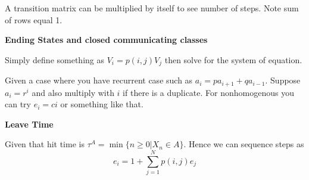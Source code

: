 \documentclass[8pt]{extarticle}
\begin{document}
A transition matrix can be multiplied by itself to see number of steps. Note sum of rows equal 1.

\textbf{Ending States and closed communicating classes}

Simply define something as $V_i = p(i,j)V_j$ then solve for the system of equation.

Given a case where you have recurrent case such as $a_i = pa_{i+1} + qa_{i-1}$. Suppose $a_i = r^i$ and also
multiply with $i$ if there is a duplicate. For nonhomogenous you can try $e_i = ci$ or something like that.

\textbf{Leave Time}

Given that hit time is $\tau^A = \min\{n\geq 0| X_n \in A\}$. Hence we can sequence steps as
$$e_i = 1 + \sum_{j=1}^Np(i,j)e_j$$
\end{document}
